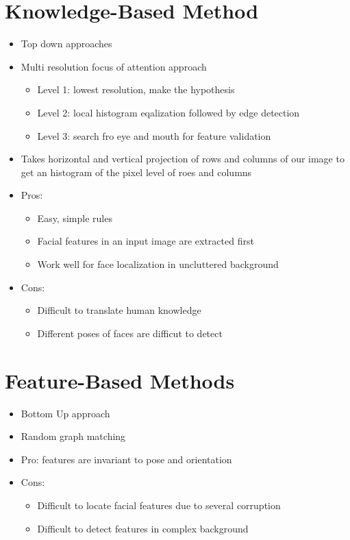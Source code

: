 \documentclass[12pt,oneside]{report}
\begin{document}
\section{Knowledge-Based Method}
\begin{itemize}
    \item Top down approaches
    \item Multi resolution focus of attention approach
    \begin{itemize}
        \item Level 1: lowest resolution, make the hypothesis
        \item Level 2: local histogram eqalization followed by edge detection
        \item Level 3: search fro eye and mouth for feature validation
    \end{itemize}
    \item Takes horizontal and vertical projection of rows and columns of our image to get an histogram of the pixel level of roes and columns
    \item Pros:
    \begin{itemize}
        \item Easy, simple rules
        \item Facial features in an input image are extracted first
        \item Work well for face localization in uncluttered background
    \end{itemize}
    \item Cons:
    \begin{itemize}
        \item Difficult to translate human knowledge
        \item Different poses of faces are difficut to detect
    \end{itemize}
\end{itemize}

\section{Feature-Based Methods}
\begin{itemize}
    \item Bottom Up approach
    \item Random graph matching
    \item Pro: features are invariant to pose and orientation
    \item Cons:
    \begin{itemize}
        \item Difficult to locate facial features due to several corruption
        \item Difficult to detect features in complex background
    \end{itemize}
\end{itemize}
\end{document}

